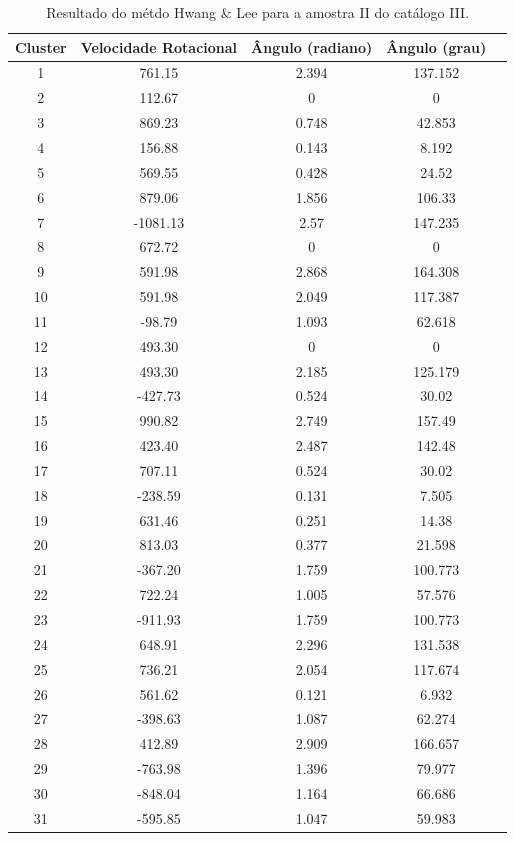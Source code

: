 {\small
\begin{longtable}{ccccc}
\caption{Resultado do métdo Hwang \& Lee para a amostra II do catálogo III.}\label{tab:norotationhwang}
\hline
\multicolumn{1}{l}{\textbf{Cluster}} & \multicolumn{1}{l}{\textbf{Velocidade Rotacional}} & \multicolumn{1}{l}{\textbf{Ângulo (radiano)}} & \multicolumn{1}{l}{\textbf{Ângulo (grau)}} \\ \hline
1 & 761.15 & 2.394 & 137.152 \\
2 & 112.67 & 0 & 0 \\
3 & 869.23 & 0.748 & 42.853 \\
4 & 156.88 & 0.143 & 8.192 \\
5 & 569.55 & 0.428 & 24.52 \\
6 & 879.06 & 1.856 & 106.33 \\
7 & -1081.13 & 2.57 & 147.235 \\
8 & 672.72 & 0 & 0 \\
9 & 591.98 & 2.868 & 164.308 \\
10 & 591.98 & 2.049 & 117.387 \\
11 & -98.79 & 1.093 & 62.618 \\
12 & 493.30 & 0 & 0 \\
13 & 493.30 & 2.185 & 125.179 \\
14 & -427.73 & 0.524 & 30.02 \\
15 & 990.82 & 2.749 & 157.49 \\
16 & 423.40 & 2.487 & 142.48 \\
17 & 707.11 & 0.524 & 30.02 \\
18 & -238.59 & 0.131 & 7.505 \\
19 & 631.46 & 0.251 & 14.38 \\
20 & 813.03 & 0.377 & 21.598 \\
21 & -367.20 & 1.759 & 100.773 \\
22 & 722.24 & 1.005 & 57.576 \\
23 & -911.93 & 1.759 & 100.773 \\
24 & 648.91 & 2.296 & 131.538 \\
25 & 736.21 & 2.054 & 117.674 \\
26 & 561.62 & 0.121 & 6.932 \\
27 & -398.63 & 1.087 & 62.274 \\
28 & 412.89 & 2.909 & 166.657 \\
29 & -763.98 & 1.396 & 79.977 \\
30 & -848.04 & 1.164 & 66.686 \\
31 & -595.85 & 1.047 & 59.983 \\

\end{longtable}}
